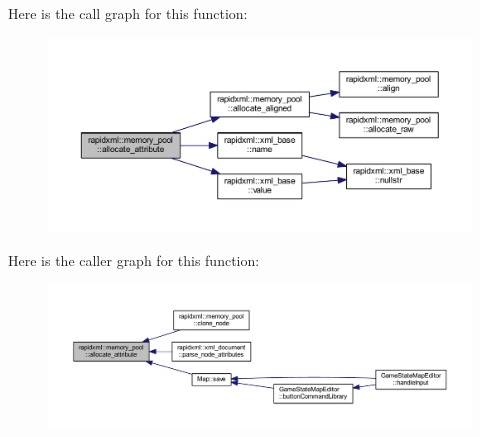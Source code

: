 Here is the call graph for this function\+:\nopagebreak
\begin{figure}[H]
\begin{center}
\leavevmode
\includegraphics[width=350pt]{classrapidxml_1_1memory__pool_a3de2a66c983336e006ea3844e244ed30_cgraph}
\end{center}
\end{figure}




Here is the caller graph for this function\+:\nopagebreak
\begin{figure}[H]
\begin{center}
\leavevmode
\includegraphics[width=350pt]{classrapidxml_1_1memory__pool_a3de2a66c983336e006ea3844e244ed30_icgraph}
\end{center}
\end{figure}


